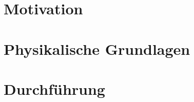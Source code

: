 \documentclass[12pt,a4paper]{article}
\begin{document}
\tableofcontents %
\listoffigures %
\listoftables %
\newpage
\section{Motivation}%

\section{Physikalische Grundlagen}

\section{Durchführung}
\end{document}
